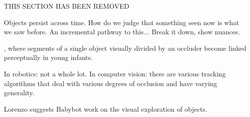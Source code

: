 
THIS SECTION HAS BEEN REMOVED


Objects persist across time.  How do we judge that something seen
now is what we saw before.  An incremental pathway to this...
Break it down, show nuances.


\cite{johnson02development}, where segments of a single object
visually divided by an occluder become linked perceptually in
young infants.


In robotics: not a whole lot.
In computer vision: there are various tracking algorithms
that deal with various degrees of occlusion and have varying
generality.

Lorenzo suggests Babybot work on the visual exploration of objects.
